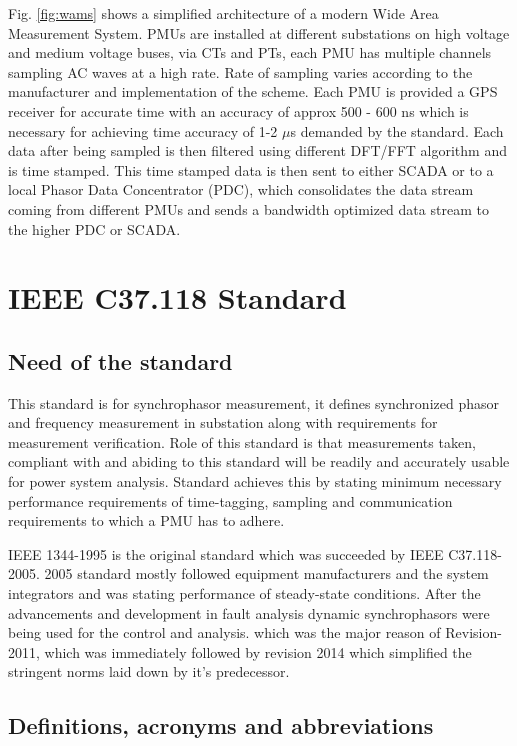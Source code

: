 Fig. \ref{fig:wams} shows a simplified architecture of a modern Wide Area Measurement System. PMUs are installed at different substations on high voltage and medium voltage buses, via CTs and PTs, each PMU has multiple channels sampling AC waves at a high rate. Rate of sampling varies according to the manufacturer and implementation of the scheme. Each PMU is provided a GPS receiver for accurate time with an accuracy of approx 500 - 600 ns which is necessary for achieving time accuracy of 1-2 $\mu$s demanded by the standard. Each data after being sampled is then filtered using different DFT/FFT algorithm and is time stamped. This time stamped data is then sent to either SCADA or to a local Phasor Data Concentrator (PDC), which consolidates the data stream coming from different PMUs and sends a bandwidth optimized data stream to the higher PDC or SCADA. 

\section{IEEE C37.118 Standard}

\subsection{Need of the standard}
This standard is for synchrophasor measurement, it defines synchronized phasor and frequency measurement in substation along with requirements for measurement verification. Role of this standard is that measurements taken, compliant with and abiding to this standard will be readily and accurately usable for power system analysis. Standard achieves this by stating minimum necessary performance requirements of time-tagging, sampling and communication requirements to which a PMU has to adhere.

IEEE 1344-1995 is the original standard which was succeeded by IEEE C37.118-2005. 2005 standard mostly followed equipment manufacturers and the system integrators and was stating performance of steady-state conditions. After the advancements and development in fault analysis dynamic synchrophasors were being used for the control and analysis.  which was the major reason of Revision-2011, which was immediately followed by revision 2014 which simplified the stringent norms laid down by it's predecessor.

\subsection{Definitions, acronyms and abbreviations}

